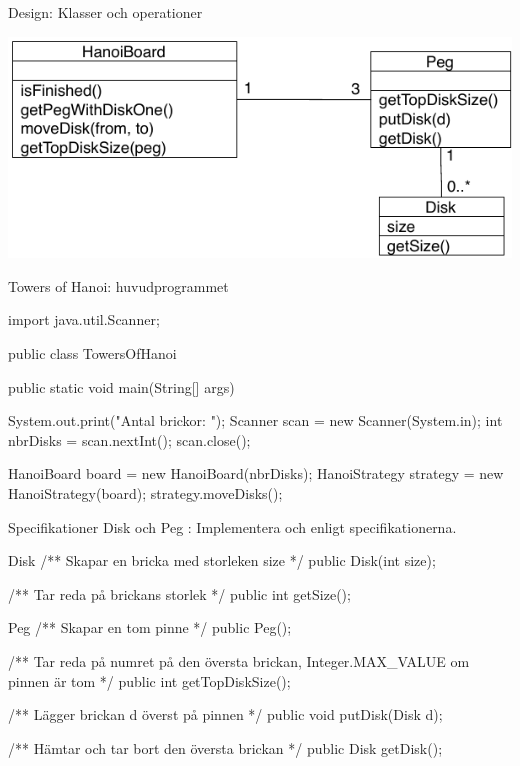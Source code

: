 \documentclass{lecturenotes}
\begin{document}
\begin{Slide}{Design: Klasser och operationer}
\begin{center}
\includegraphics[scale=0.9]{img/hanoi-design.pdf}
\end{center}
\end{Slide} 

\begin{Slide}{Towers of Hanoi: huvudprogrammet}
\begin{Code}
import java.util.Scanner;

public class TowersOfHanoi {
    public static void main(String[] args) {
        System.out.print("Antal brickor: ");
        Scanner scan = new Scanner(System.in);
        int nbrDisks = scan.nextInt();
        scan.close();
        
        HanoiBoard board = new HanoiBoard(nbrDisks);
        HanoiStrategy strategy = new HanoiStrategy(board);
        strategy.moveDisks();
    }
}
\end{Code}
\end{Slide} 

\begin{Slide}{Specifikationer Disk och Peg}
: Implementera  och  enligt specifikationerna.
\begin{ClassSpec}{Disk}
/** Skapar en bricka med storleken size */
public Disk(int size);

/** Tar reda på brickans storlek */
public int getSize();
\end{ClassSpec}
\begin{ClassSpec}{Peg}
/** Skapar en tom pinne */
public Peg();

/** Tar reda på numret på den översta brickan, Integer.MAX_VALUE om pinnen är tom */
public int getTopDiskSize();

/** Lägger brickan d överst på pinnen */
public void putDisk(Disk d);

/** Hämtar och tar bort den översta brickan */
public Disk getDisk();
\end{ClassSpec}
\end{Slide} 
\end{document}
